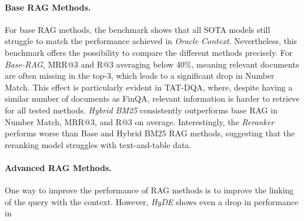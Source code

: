 \documentclass[10pt]{article}
\begin{document}
\paragraph{Base RAG Methods.} For base RAG methods, the benchmark shows that all SOTA models still struggle to match the performance achieved in \textit{Oracle Context}. Nevertheless, this benchmark offers the possibility to compare the different methods precisely. For \textit{Base-RAG}, MRR@3 and R@3 averaging below 40\%, meaning relevant documents are often missing in the top-3, which leads to a significant drop in Number Match. This effect is particularly evident in TAT-DQA, where, despite having a similar number of documents as FinQA, relevant information is harder to retrieve for all tested methods. \textit{Hybrid BM25} consistently outperforms base RAG in Number Match, MRR@3, and R@3 on average. Interestingly, the \textit{Reranker} performs worse than Base and Hybrid BM25 RAG methods, suggesting that the reranking model struggles with text-and-table data.

\paragraph{Advanced RAG Methods.} One way to improve the performance of RAG methods is to improve the linking of the query with the context. However, \textit{HyDE} shows even a drop in performance in
\end{document}
